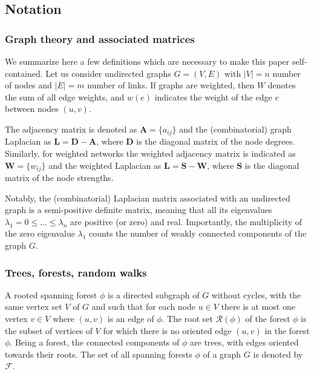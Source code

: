 \documentclass[10pt,aps,pre,twocolumn,nofootinbib,superscriptaddress,longbibliography]{revtex4-1}
\newcommand{\bA}{\mathbf{A}}
\newcommand{\bS}{\mathbf{S}}
\newcommand{\bD}{\mathbf{D}}
\newcommand{\bL}{\mathbf{L}}
\newcommand{\bW}{\mathbf{W}}
\begin{document}
\subsection{Notation}
\subsubsection{Graph theory and associated matrices}
We summarize here a few definitions which are necessary to make this paper self-contained.
Let us consider undirected graphs $G=(V,E)$ with $|V|=n$ number of nodes and $|E|=m$ number of links. If graphs are weighted, then $W$ denotes the sum of all edge weights, and $w(e)$ indicates the weight of the edge $e$ between nodes $(u,v)$.

The adjacency matrix is denoted as $\bA=\{a_{ij}\}$ and the (combinatorial) graph Laplacian as $\bL = \bD - \bA$, where $\bD$ is the diagonal matrix of the node degrees.
Similarly, for weighted networks the weighted adjacency matrix is indicated as $\bW = \{ w_{ij}\}$ and the weighted Laplacian as $\bL = \bS - \bW$, where $\bS$ is the diagonal matrix of the node strengths.

Notably, the (combinatorial) Laplacian matrix associated with an undirected graph is a semi-positive definite matrix, meaning that all its eigenvalues $\lambda_1=0 \leq \ldots \leq \lambda_n$ are positive (or zero) and real. Importantly, the multiplicity of the zero eigenvalue $\lambda_1$ counts the number of weakly connected components of the graph $G$.

\subsubsection{Trees, forests, random walks}
A rooted spanning forest $\phi$ is a directed subgraph of $G$ without cycles, with the same vertex set $V$ of $G$ and such that for each node $u \in V$ there is at most one vertex $v \in V$ where $(u,v)$ is an edge of $\phi$.
The root set $\mathcal{R}(\phi)$ of the forest $\phi$ is the subset of vertices of $V$ for which there is no oriented edge $(u,v)$ in the forest $\phi$.
Being a forest, the connected components of $\phi$ are trees, with edges oriented towards their roots.
The set of all spanning forests $\phi$ of a graph $G$ is denoted by $\mathcal{F}$.
\end{document}
